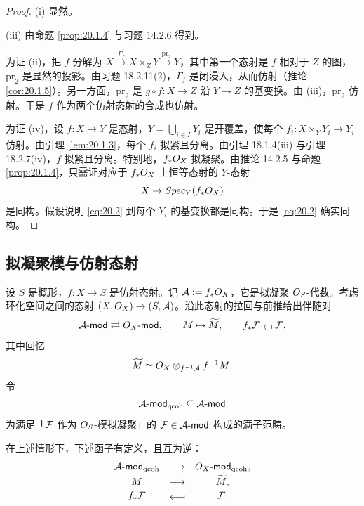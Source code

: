 \begin{proof}
(i) 显然。

(iii) 由命题 \ref{prop:20.1.4} 与习题 14.2.6 得到。

为证 (ii)，把 $f$ 分解为 $X\xrightarrow{\Gamma_f}X\times_ZY\xrightarrow{\mathrm{pr}_2}Y$，其中第一个态射是 $f$ 相对于 $Z$ 的图，$\mathrm{pr}_2$ 是显然的投影。由习题 18.2.11(2)，$\Gamma_f$ 是闭浸入，从而仿射（推论 \ref{cor:20.1.5}）。另一方面，$\mathrm{pr}_2$ 是 $g\circ f:X\to Z$ 沿 $Y\to Z$ 的基变换。由 (iii)，$\mathrm{pr}_2$ 仿射。于是 $f$ 作为两个仿射态射的合成也仿射。

为证 (iv)，设 $f:X\to Y$ 是态射，$Y=\bigcup_{i\in I}Y_i$ 是开覆盖，使每个 $f_i:X\times_YY_i\to Y_i$ 仿射。由引理 \ref{lem:20.1.3}，每个 $f_i$ 拟紧且分离。由引理 18.1.4(iii) 与引理 18.2.7(iv)，$f$ 拟紧且分离。特别地，$f_*O_X$ 拟凝聚。由推论 14.2.5 与命题 \ref{prop:20.1.4}，只需证对应于 $f_*O_X$ 上恒等态射的 $Y$-态射
\begin{equation}\label{eq:20.2}
X\to Spec_Y(f_*O_X)
\end{equation}
是同构。假设说明 \eqref{eq:20.2} 到每个 $Y_i$ 的基变换都是同构。于是 \eqref{eq:20.2} 确实同构。
\end{proof}

\subsection{拟凝聚模与仿射态射}\label{sec:20.2}

\begin{construction}\label{con:20.2.1}
设 $S$ 是概形，$f:X\to S$ 是仿射态射。记 $\mathcal{A}:=f_*O_X$，它是拟凝聚 $O_S$-代数。考虑环化空间之间的态射 $(X,O_X)\to(S,\mathcal{A})$。沿此态射的拉回与前推给出伴随对
\[
\cA\text{-}\mathsf{mod}\rightleftarrows\cO_X\text{-}\mathsf{mod},\qquad
M\mapsto\widetilde{M},\qquad
f_*\cF\mapsfrom\cF,
\]
其中回忆
\[
\widetilde{M}\simeq O_X\otimes_{f^{-1}\mathcal{A}}f^{-1}M.
\]
令
\[
\mathcal{A}\text{-}\mathsf{mod}_{\mathrm{qcoh}}\subseteq\mathcal{A}\text{-}\mathsf{mod}
\]
为满足「$\mathcal{F}$ 作为 $O_S$-模拟凝聚」的 $\mathcal{F}\in\mathcal{A}\text{-}\mathsf{mod}$ 构成的满子范畴。
\end{construction}

\begin{proposition}\label{prop:20.2.2}
在上述情形下，下述函子有定义，且互为逆：
\[
\begin{array}{ccc}
\cA\text{-}\mathsf{mod}_{\mathrm{qcoh}} & \longrightarrow & \cO_X\text{-}\mathsf{mod}_{\mathrm{qcoh}},\\[2pt]
M & \longmapsto & \widetilde{M},\\[2pt]
f_*\cF & \longmapsfrom & \cF.
\end{array}
\]
\end{proposition}

